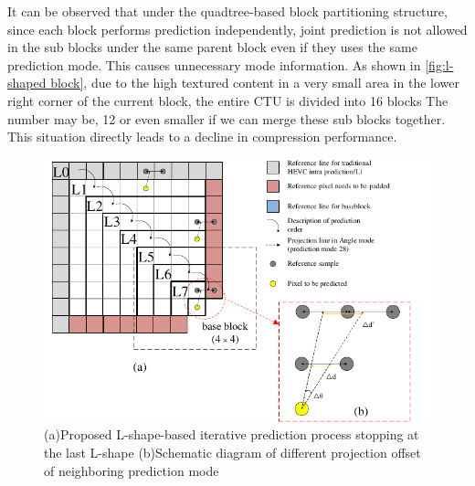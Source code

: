 \documentclass[journal]{IEEEtran}
\begin{document}
It can be observed that under the quadtree-based block partitioning structure, since each block performs prediction independently, joint prediction is not allowed in the sub blocks under the same parent block even if they uses the same prediction mode. This causes unnecessary mode information. As shown in \autoref{fig:l-shaped block}, due to the high textured content in a very small area in the lower right corner of the current block, the entire CTU is divided into 16 blocks The number may be, 12 or even smaller if we can merge these sub blocks together. This situation directly leads to a decline in compression  performance.

\begin{figure}[htpb]
\centering
\includegraphics[width=14cm]{pictures/Lprediction}
\caption{(a)Proposed L-shape-based iterative prediction process stopping at the last L-shape (b)Schematic diagram of different projection offset of neighboring prediction mode}
\label{fig:comparison}
\end{figure}
\end{document}
